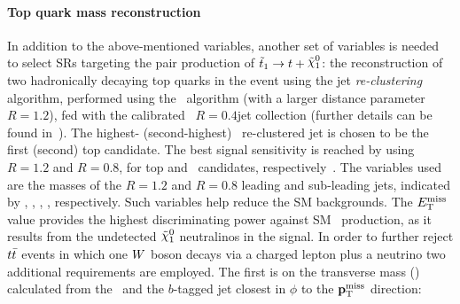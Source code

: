 



			\paragraph*{Top quark mass reconstruction}

				In addition to the above-mentioned variables, another set of variables is needed to select \acp{SR} targeting the pair production of $\stopone \to t + \ninoone$: the reconstruction of two hadronically decaying top quarks in the event using the jet \emph{re-clustering} algorithm, performed using the \antikt\ algorithm (with a larger distance parameter $R = 1.2$), fed with the calibrated \antikt\ $R = 0.4 $jet collection (further details can be found in~\cite{Antikt2008}). The highest- (second-highest) \pt\ re-clustered jet is chosen to be the first (second) top candidate. The best signal sensitivity is reached by using $R = 1.2$ and $R = 0.8$, for top and \Wboson\ candidates, respectively~\cite{stop0L,ICHEPstop0L}. The variables used are the masses of the $R=1.2$ and $R=0.8$ leading and sub-leading jets, indicated by \mantikttwelvezero, \mantikttwelveone, \mantikteightzero, \mantikteightone, respectively. Such variables help reduce the \ac{SM} backgrounds. %
				The $E_{\mathrm{T}}^{\mathrm{miss}}$ value provides the highest discriminating power against \ac{SM} \ttbar\ production, as it results from the undetected $\ninoone$ neutralinos in the signal. In order to further reject $t\bar{t}$ events in which one $W$ boson decays via a charged lepton plus a neutrino two additional requirements are employed. The first is on the transverse mass (\mt) calculated from the \met\ and the $b$-tagged jet closest in $\phi$ to the $\mathbf{p}_\mathrm{T}^\mathrm{miss}$ direction: 

